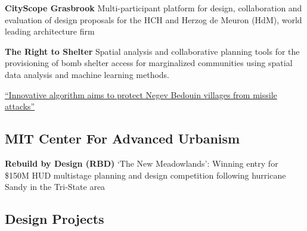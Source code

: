 \begin{tablist}
\begin{tablist}
    \end{tablist}

    \item[`18-`21] \tab \textbf{CityScope Grasbrook} {Multi-participant platform for design, collaboration and evaluation of design proposals for the HCH and Herzog de Meuron (HdM), world leading architecture firm}

    \item[`24-`26] \tab \textbf{The Right to Shelter} {Spatial analysis and collaborative planning tools for the provisioning of bomb shelter access for marginalized communities using spatial data analysis and machine learning methods.}

    \begin{tablist}
        \item[`25] \tab \href{https://www.ynetnews.com/real-estate/article/s1zbwjtyxx}{``Innovative algorithm aims to protect Negev Bedouin villages from missile attacks''}
    \end{tablist}




\end{tablist}


\subsection*{MIT Center For Advanced Urbanism}



\begin{tablist}

    \item[`13-`14] \tab \textbf{Rebuild by Design (RBD)}
    {‘The New Meadowlands’: Winning entry for \$150M HUD multistage planning and design competition following hurricane Sandy in the Tri-State area}
\end{tablist}


\subsection*{Design Projects}


